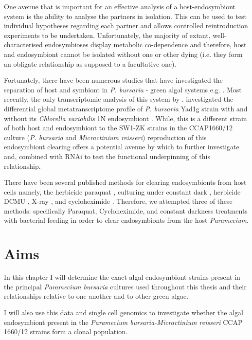One avenue that is important for an effective analysis of a host-endosymbiont
system is the ability to analyse the partners in isolation.  This can be used
to test individual hypotheses regarding each partner and  allows controlled
reintroduction experiments to be undertaken. 
Unfortunately,
the majority of extant, well-characterised endosymbioses display metabolic co-dependence
and therefore, host and endosymbiont cannot be isolated without one or other dying (i.e. they
form an obligate relationship as supposed to a facultative one). 

Fortunately, there have been numerous studies that have investigated the separation of 
host and symbiont in \textit{P. bursaria} - green algal systems e.g. \citep{Hosoya1995a,Achilles-Day2013,
Karakashian1963}. Most recently, the only transcriptomic analysis of this system by \citep{Kodama2014c}.
investigated the differential global metatranscriptome profile of \textit{P. bursaria} Yad1g strain with 
 and without its \textit{Chlorella variabilis} 1N endosymbiont 
\citep{Kodama2014c}.   While, this is a different strain of both host and endosymbiont to the SW1-ZK 
strains in the CCAP1660/12 culture
(\textit{P. bursaria} and \textit{Micractinium reisseri}) reproduction of this endosymbiont
clearing offers a potential avenue by which to further investigate and, combined with RNAi 
to test the functional underpinning of this relationship. 

There have been several published methods
for clearing endosymbionts from host cells namely, the herbicide paraquat \citep{Hosoya1995a}, 
culturing under constant dark \citep{Karakashian1963}, herbicide DCMU \citep{Kodama2009a},
X-ray \citep{Wichterman1948}, and cycloheximide \citep{weis1984effect,Kodama2007}.
Therefore, we attempted three of these methods: specifically Paraquat, Cycloheximide, and 
constant darkness treatments with bacterial feeding 
in order to clear endosymbionts from the host \textit{Paramecium}.

\section{Aims}

In this chapter I will determine the exact algal endosymbiont strains present
in the principal \textit{Paramecium bursaria} cultures used throughout
this thesis and their relationships relative to one another and to
other green algae. 

I will also use this data and single cell genomics to investigate whether the algal
endosymbiont present in the \textit{Paramecium bursaria-Micractinium reisseri}
CCAP 1660/12 strains form a clonal population. 

